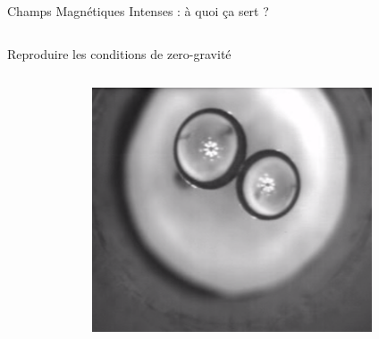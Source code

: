 \begin{frame}{Champs Magnétiques Intenses : à quoi ça sert ?}
\begin{columns}[c]
\begin{column}{0.78\textwidth}
\begin{block}{Reproduire les conditions de zero-gravité}
\begin{columns}[c]
\begin{column}{0.5\textwidth}
\begin{figure}[H]
              \end{figure}
            \end{column}
            \begin{column}{0.5\textwidth}
              \begin{figure}[H]
                \centering
                \includegraphics[scale=0.12]{Figures/cmi/levitation_2.png}
              \end{figure}
            \end{column}
          \end{columns}
        \end{block}
      \end{column}
      \begin{column}{0.25\textwidth}
        \begin{figure}[H]
          \centering

\end{figure}
\end{column}
\end{columns}
\end{frame}
